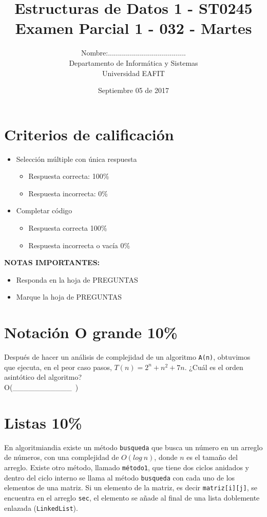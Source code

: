 \documentclass[twocolumn]{article}
\author{
Nombre:....................................... \\
    Departamento de Informática y Sistemas \\
    Universidad EAFIT \\
}
\title{
    Estructuras de Datos 1 - ST0245 \\
    Examen Parcial 1 - 032 - Martes
}
\date{
    Septiembre 05 de 2017
}
\begin{document}
\vspace{-5cm}
\maketitle


\section*{Criterios de calificación}

{\small
\begin{itemize}
\item Selección múltiple con única respuesta
\begin{itemize}
\item Respuesta correcta: 100\%
\item Respuesta incorrecta: 0\%
\end{itemize}

\item Completar código
\begin{itemize}
\item Respuesta correcta 100\%
\item Respuesta incorrecta o vacía 0\%\\
\end{itemize}
\end{itemize}


\textbf{NOTAS IMPORTANTES:}
\begin{itemize}
	\item Responda en la hoja de PREGUNTAS
	\item Marque la hoja de PREGUNTAS
\end{itemize}
}

\section{Notación O grande 10\%}
Después de hacer un análisis de complejidad de un algoritmo \texttt{A(n)}, obtuvimos que ejecuta, en el peor caso pasos, $T(n) = 2^n + n^2 + 7n$. ¿Cuál es el orden asintótico del algoritmo? \\

O(\_\_\_\_\_\_\_\_\_\_\_\ )


\section{Listas 10\%}

En algoritmiandia existe un método \texttt{busqueda} que busca un número en un arreglo de números, con una complejidad de $O(log \ n)$, donde $n$ es el tamaño del arreglo.
Existe otro método, llamado \texttt{método1}, que tiene dos ciclos anidados y dentro del ciclo interno se llama al método \texttt{busqueda} con cada uno de los elementos
de una matriz. Si un elemento de la matriz, es decir \texttt{matriz[i][j]}, se encuentra en el arreglo \texttt{sec}, el elemento  se añade al final de una lista doblemente enlazada (\texttt{LinkedList}).
\end{document}
